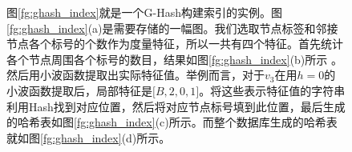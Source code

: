 \documentclass{XDBAthesis}
\begin{document}
    \begin{figure}[htb]
            \begin{exmp}
        图\ref{fg:ghash_index}就是一个G-Hash构建索引的实例。图\ref{fg:ghash_index}(a)是需要存储的一幅图。我们选取节点标签和邻接节点各个标号的个数作为度量特征，所以一共有四个特征。首先统计各个节点周围各个标号的数目，结果如图\ref{fg:ghash_index}(b)所示 。然后用小波函数提取出实际特征值。举例而言，对于$v_{3}$在用$h=0$的小波函数提取后，局部特征是$\lbrack B,2,0,1\rbrack $。将这些表示特征值的字符串利用Hash找到对应位置，然后将对应节点标号填到此位置，最后生成的哈希表如图\ref{fg:ghash_index}(c)所示。而整个数据库生成的哈希表就如图\ref{fg:ghash_index}(d)所示。
        \label{ep:ghash_index}
        
    \end{exmp}
\end{figure}
\end{document}
